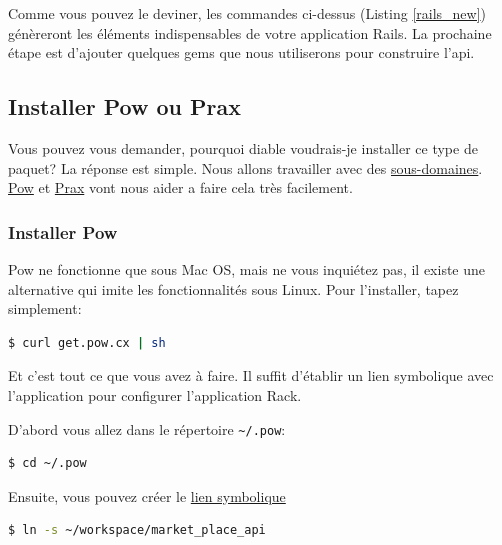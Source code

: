 \documentclass[]{report}
\begin{document}
    Comme vous pouvez le deviner, les commandes ci-dessus (Listing \ref{rails_new}) génèreront les éléments indispensables de votre application Rails. La prochaine étape est d'ajouter quelques gems que nous utiliserons pour construire l'api.

    \subsection{Installer Pow ou Prax}\label{subsection:install_pow}

      Vous pouvez vous demander, pourquoi diable voudrais-je installer ce type de paquet? La réponse est simple. Nous allons travailler avec des \href{http://en.wikipedia.org/wiki/Subdomain}{sous-domaines}. \href{http://pow.cx/}{Pow} et \href{https://github.com/ysbaddaden/prax.cr}{Prax} vont nous aider a faire cela très facilement.

      \subsubsection{Installer Pow}

        Pow ne fonctionne que sous Mac OS, mais ne vous inquiétez pas, il existe une alternative qui imite les fonctionnalités sous Linux. Pour l'installer, tapez simplement:

        \begin{scriptsize}
        \begin{lstlisting}[language=bash]
        $ curl get.pow.cx | sh
        \end{lstlisting}
        \end{scriptsize}

        Et c'est tout ce que vous avez à faire. Il suffit d'établir un lien symbolique avec l'application pour configurer l'application Rack.

        D'abord vous allez dans le répertoire \verb|~/.pow|:

        \begin{scriptsize}
        \begin{lstlisting}[language=bash]
        $ cd ~/.pow
        \end{lstlisting}
        \end{scriptsize}

        Ensuite, vous pouvez créer le \href{http://en.wikipedia.org/wiki/Symbolic_link}{lien symbolique}

        \begin{scriptsize}
        \begin{lstlisting}[language=bash]
        $ ln -s ~/workspace/market_place_api
        \end{lstlisting}
        \end{scriptsize}
\end{document}
